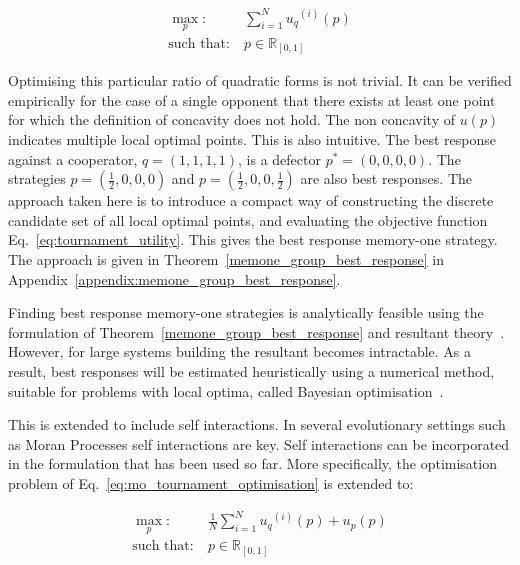 \documentclass[10pt]{article}
\newcommand{\R}{\mathbb{R}}
\begin{document}
\begin{equation}\label{eq:mo_tournament_optimisation}
    \begin{aligned}
    \max_p: & \ \sum_{i=1} ^ {N} {u_q}^{(i)} (p)
    \\
    \text{such that}: & \ p \in \R_{[0, 1]}
    \end{aligned}
\end{equation}

Optimising this particular ratio of quadratic forms is not trivial. It can be
verified empirically for the case of a single opponent that there exists at
least one point for which the definition of concavity does not hold.
The non concavity of \(u(p)\) indicates multiple local
optimal points. This is also intuitive. The best response against a cooperator,
\(q=(1, 1, 1, 1)\), is a defector \(p^*=(0, 0, 0, 0)\). The strategies
\(p=(\frac{1}{2}, 0, 0, 0)\) and \(p=(\frac{1}{2}, 0, 0, \frac{1}{2})\) are also
best responses. The approach taken here is to introduce a compact way of
constructing the discrete candidate set of all local optimal points, and evaluating
the objective function Eq.~\ref{eq:tournament_utility}. This gives the best
response memory-one strategy. The approach is given in
Theorem~\ref{memone_group_best_response} in Appendix~\ref{appendix:memone_group_best_response}.

Finding best response memory-one strategies is analytically feasible using the
formulation of Theorem~\ref{memone_group_best_response} and resultant
theory~\cite{Jonsson2005}. However, for large systems building the resultant
becomes intractable. As a result, best responses will be estimated
heuristically using a numerical method, suitable for problems with local optima,
called Bayesian optimisation~\cite{Mokus1978}.

This is extended to include self interactions. In several evolutionary settings
such as Moran Processes self interactions are key. %
Self interactions can be incorporated in the
formulation that has been used so far. More specifically, the optimisation
problem of Eq.~\ref{eq:mo_tournament_optimisation} is extended to:

\begin{equation}\label{eq:mo_evolutionary_optimisation}
\begin{aligned}
\max_p: & \ \frac{1}{N} \sum\limits_{i=1} ^ {N} {u_q}^{(i)} (p) + u_p(p)
\\
\text{such that}: & \ p \in \R_{[0, 1]}
\end{aligned}
\end{equation}
\end{document}
